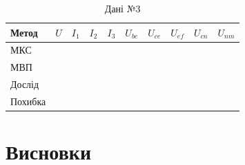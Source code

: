 \documentclass[a4paper,oneside,DIV=10,12pt]{scrartcl}
\begin{document}
		\begin{table}[!htbp]
		\centering
			\begin{tabular}{
				l
				S
				S
				S
				S
				S
				S
				S
				S
				S
			}
				\toprule
					Метод &
					{$U$} &
					{$I_1$} &
					{$I_2$} &
					{$I_3$} &
					{$U_{bc}$} &
					{$U_{ce}$} &
					{$U_{ef}$} &
					{$U_{cn}$} &
					{$U_{nm}$} \\
				\midrule
					МКС     & & & & & & & & & \\
					МВП     & & & & & & & & & \\
					Дослід  & & & & & & & & & \\
					Похибка & & & & & & & & & \\
				\bottomrule
			\end{tabular}
		\caption{Дані №3}
		\label{tab:measurements-03}
		\end{table}
		
	\section{Висновки}
\end{document}
